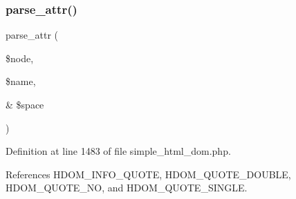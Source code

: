 \subsubsection{\texorpdfstring{parse\+\_\+attr()}{parse\_attr()}}
{\footnotesize\ttfamily parse\+\_\+attr (\begin{DoxyParamCaption}\item[{}]{\$node,  }\item[{}]{\$name,  }\item[{\&}]{\$space }\end{DoxyParamCaption})\hspace{0.3cm}{\ttfamily [protected]}}



Definition at line 1483 of file simple\+\_\+html\+\_\+dom.\+php.



References H\+D\+O\+M\+\_\+\+I\+N\+F\+O\+\_\+\+Q\+U\+O\+TE, H\+D\+O\+M\+\_\+\+Q\+U\+O\+T\+E\+\_\+\+D\+O\+U\+B\+LE, H\+D\+O\+M\+\_\+\+Q\+U\+O\+T\+E\+\_\+\+NO, and H\+D\+O\+M\+\_\+\+Q\+U\+O\+T\+E\+\_\+\+S\+I\+N\+G\+LE.


